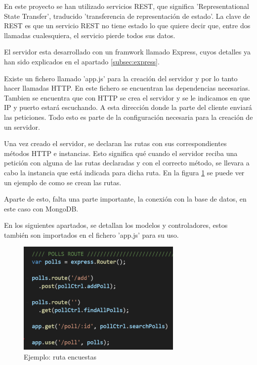\documentclass[a4paper, 12pt]{book}
\begin{document}
En este proyecto se han utilizado servicios REST, que significa 'Representational State Transfer', traducido 'transferencia de representaci\'on de estado'. La clave de REST es que un servicio REST no tiene estado lo que quiere decir que, entre dos llamadas cualesquiera, el servicio pierde todos sus datos.

El servidor esta desarrollado con un framwork llamado Express, cuyos detalles ya han sido explicados en el apartado \ref{subsec:express}. 

Existe un fichero llamado 'app.js' para la creaci\'on del servidor y por lo tanto hacer llamadas HTTP. En este fichero se encuentran las dependencias necesarias. Tambien se encuentra que con HTTP se crea el servidor y se le indicamos en que IP y puerto estar\'a escuchando. A esta direcci\'on donde la parte del cliente enviar\'a las peticiones. Todo esto es parte de la configuraci\'on necesaria para la creaci\'on de un servidor.

Una vez creado el servidor, se declaran las rutas con sus correspondientes m\'etodos HTTP e instancias. Esto significa qu\'e cuando el servidor reciba una petici\'on con alguna de las rutas declaradas y con el correcto m\'etodo, se llevara a cabo la instancia que est\'a indicada para dicha ruta. En la figura \ref{f:ej_route} se puede ver un ejemplo de como se crean las rutas.

Aparte de esto, falta una parte importante, la conexi\'on con la base de datos, en este caso con MongoDB.

En los siguientes apartados, se detallan los modelos y controladores, estos tambi\'en son importados en el fichero 'app.js' para su uso.

\begin{figure}[H]
  \centering
  \includegraphics[width=8cm, keepaspectratio]{img/ej_route.png}
  \caption{Ejemplo: ruta encuestas}
  \label{f:ej_route}
\end{figure}
\end{document}
